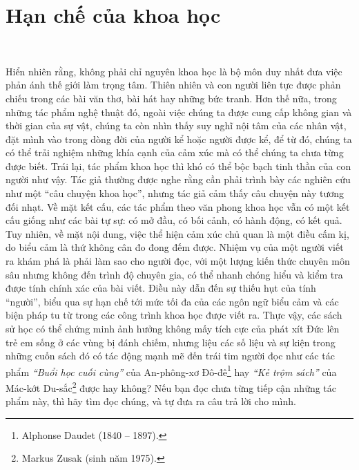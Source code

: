 \section{Hạn chế của khoa học}

\ 

Hiển nhiên rằng, không phải chỉ nguyên khoa học là bộ môn duy nhất đưa việc phản ánh thế giới làm trọng tâm. Thiên nhiên và con người liên tực được phản chiếu trong các bài văn thơ, bài hát hay những bức tranh. Hơn thế nữa, trong những tác phẩm nghệ thuật đó, ngoài việc chúng ta được cung cấp không gian và thời gian của sự vật, chúng ta còn nhìn thấy suy nghĩ nội tâm của các nhân vật, đặt mình vào trong dòng đời của người kể hoặc người được kể, để từ đó, chúng ta có thể trải nghiệm những khía cạnh của cảm xúc mà có thể chúng ta chưa từng được biết. Trái lại, tác phẩm khoa học thì khó có thể bộc bạch tinh thần của con người như vậy. Tác giả thường được nghe rằng cần phải trình bày các nghiên cứu như một ``câu chuyện khoa học'', nhưng tác giả cảm thấy câu chuyện này tương đối nhạt. Về mặt kết cấu, các tác phẩm theo văn phong khoa học vẫn có một kết cấu giống như các bài tự sự: có mở đầu, có bối cảnh, có hành động, có kết quả. Tuy nhiên, về mặt nội dung, việc thể hiện cảm xúc chủ quan là một điều cấm kị, do biểu cảm là thứ không cân đo đong đếm được. Nhiệm vụ của một người viết ra khám phá là phải làm sao cho người đọc, với một lượng kiến thức chuyên môn sâu nhưng không đến trình độ chuyên gia, có thể nhanh chóng hiểu và kiểm tra được tính chính xác của bài viết. Điều này dẫn đến sự thiếu hụt của tính ``người'', biểu qua sự hạn chế tới mức tối đa của các ngôn ngữ biểu cảm và các biện pháp tu từ trong các công trình khoa học được viết ra. Thực vậy, các sách sử học có thể chứng minh ảnh hưởng không mấy tích cực của phát xít Đức lên trẻ em sống ở các vùng bị đánh chiếm, nhưng liệu các số liệu và sự kiện trong những cuốn sách đó có tác động mạnh mẽ đến trái tim người đọc như các tác phẩm \emph{``Buổi học cuối cùng''} của An-phông-xơ Đô-đê\footnote{Alphonse Daudet (1840 -- 1897).} hay \emph{``Kẻ trộm sách''} của Mác-kớt Du-sắc\footnote{Markus Zusak (sinh năm 1975).} được hay không? Nếu bạn đọc chưa từng tiếp cận những tác phẩm này, thì hãy tìm đọc chúng, và tự đưa ra câu trả lời cho mình.